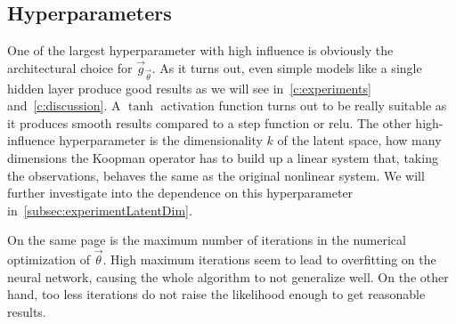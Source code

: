 	\subsection{Hyperparameters}
		One of the largest hyperparameter with high influence is obviously the architectural choice for \( \vec{g}_{\vec{\theta}} \). As it turns out, even simple models like a single hidden layer produce good results as we will see in~\autoref{c:experiments} and~\ref{c:discussion}. A \( \tanh \) activation function turns out to be really suitable as it produces smooth results compared to \eg a step function or \ac{relu}. The other high-influence hyperparameter is the dimensionality \(k\) of the latent space, \ie how many dimensions the Koopman operator has to build up a linear system that, taking the observations, behaves the same as the original nonlinear system. We will further investigate into the dependence on this hyperparameter in~\autoref{subsec:experimentLatentDim}.

		On the same page is the maximum number of iterations in the numerical optimization of \( \vec{\theta} \). High maximum iterations seem to lead to overfitting on the neural network, causing the whole algorithm to not generalize well. On the other hand, too less iterations do not raise the likelihood enough to get reasonable results.
